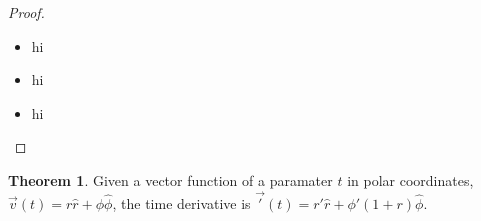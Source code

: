 \documentclass[12pt]{article}
\theoremstyle{definition}
\newtheorem{theorem}{Theorem}
\begin{document}
\begin{proof}

\begin{itemize}

	\item hi 
	
	\item hi
	
	\item hi
	
\end{itemize}

\end{proof}

\begin{theorem}

Given a vector function of a paramater $t$ in polar coordinates, $\vec{v}(t) = r\hat{r} + \phi\hat{\phi}$, the time derivative is $\vec'(t) = r'\hat{r} + \phi'(1 + r)\hat{\phi}$.

\end{theorem}
\end{document}
